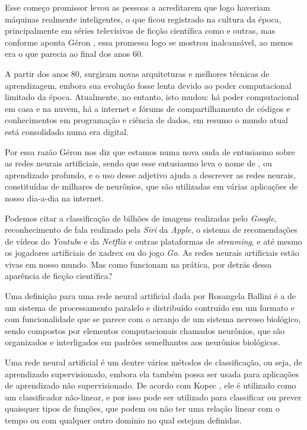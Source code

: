 Esse começo promissor levou as pessoas a acreditarem que logo haveriam máquinas realmente inteligentes, o que ficou registrado na cultura da época, principalmente em séries televisivas de ficção científica como  e outras, mas conforme aponta Géron \citep{hands}, essa promessa logo se mostrou inalcansável, ao menos era o que parecia ao final dos anos 60. 

A partir dos anos 80, surgiram novas arquiteturas e melhores técnicas de aprendizagem, embora sua evolução fosse lenta devido ao poder computacional limitado da época. Atualmente, no entanto, isto mudou: há poder computacional em casa e na nuvem, há a internet e fórums de compartilhamento de códigos e conhecimentos em programação e ciência de dados, em resumo o mundo atual está consolidado numa era digital. 

Por essa razão Géron \citep{hands} nos diz que estamos numa nova onda de entusiasmo sobre as redes neurais artificiais, sendo que esse entusiasmo leva o nome de , ou aprendizado profundo, e o uso desse adjetivo ajuda a descrever as redes neurais, constituídas de milhares de neurônios, que são utilizadas em várias aplicações de nosso dia-a-dia na internet.

Podemos citar a classificação de bilhões de imagens realizadas pelo \emph{Google}, reconhecimento de fala realizado pela \emph{Siri} da \emph{Apple}, o sistema de recomendações de vídeos do \emph{Youtube} e da \emph{Netflix} e outras plataformas de \emph{streaming}, e até mesmo os jogadores artificiais de xadrex ou do jogo \emph{Go}. As redes neurais artificiais estão vivas em nosso mundo. Mas como funcionam na prática, por detrás dessa aparência de ficção científica?

Uma definição para uma rede neural artificial dada por Rosangela Ballini \citep{doutorado} é a de um sistema de processamento paralelo e distribuído contruído em um formato e com funcionalidade que se parece com o arranjo de um sistema nervoso biológico, sendo compostos por elementos computacionais chamados neurônios, que são organizados e interligados em padrões semelhantes aos neurônios biológicos.

Uma rede neural artificial é um dentre vários métodos de classificação, ou seja, de aprendizado supervisionado, embora ela também possa ser usada para aplicações de aprendizado não supervisionado. De acordo com Kopec \citep{classic}, ele é utilizado como um classificador não-linear, e por isso pode ser utilizado para classificar ou prever quaisquer tipos de funções, que podem ou não ter uma relação linear com o tempo ou com qualquer outro domínio no qual estejam definidas.

